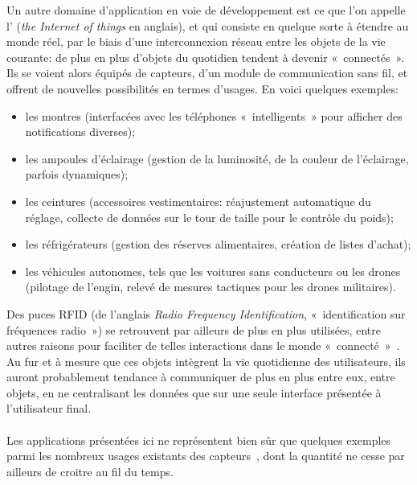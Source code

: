 Un autre domaine d'application en voie de développement est ce que l'on appelle l'\textit{} (\textit{the Internet of things} en anglais), et qui consiste en quelque sorte à étendre  au monde réel, par le biais d'une interconnexion réseau entre les objets de la vie courante: de plus en plus d'objets du quotidien tendent à devenir « connectés ».
Ils se voient alors équipés de capteurs, d'un module de communication sans fil, et offrent de nouvelles possibilités en termes d'usages.
En voici quelques exemples:
\begin{itemize}
    \item les montres (interfacées avec les téléphones « intelligents » pour afficher des notifications diverses);
    \item les ampoules d'éclairage (gestion de la luminosité, de la couleur de l'éclairage, parfois dynamiques);
    \item les ceintures (accessoires vestimentaires: réajustement automatique du réglage, collecte de données sur le tour de taille pour le contrôle du poids);
    \item les réfrigérateurs (gestion des réserves alimentaires, création de listes d'achat);
    \item les véhicules autonomes, tels que les voitures sans conducteurs ou les drones (pilotage de l'engin, relevé de mesures tactiques pour les drones militaires).
\end{itemize}
Des puces RFID (de l'anglais \textit{Radio Frequency Identification}, « identification sur fréquences radio ») se retrouvent par ailleurs de plus en plus utilisées, entre autres raisons pour faciliter de telles interactions dans le monde « connecté »~\cite{TW10}.
Au fur et à mesure que ces objets intègrent la vie quotidienne des utilisateurs, ils auront probablement tendance à communiquer de plus en plus entre eux, entre objets, en ne centralisant les données que sur une seule interface présentée à l'utilisateur final.

        \paragraph{}
Les applications présentées ici ne représentent bien sûr que quelques exemples parmi les nombreux usages existants des capteurs~\cite{ASSC02}, dont la quantité ne cesse par ailleurs de croitre au fil du temps.

